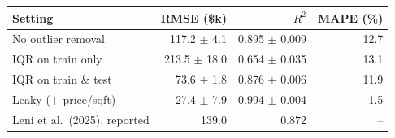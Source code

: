 \setlength{\tabcolsep}{3pt}
\begin{tabular}{lrrr}
\hline
Setting & RMSE (\$k) & $R^2$ & MAPE (\%) \\
\hline
No outlier removal & 117.2 $\pm$ 4.1 & 0.895 $\pm$ 0.009 & 12.7 \\
IQR on train only & 213.5 $\pm$ 18.0 & 0.654 $\pm$ 0.035 & 13.1 \\
IQR on train \& test & 73.6 $\pm$ 1.8 & 0.876 $\pm$ 0.006 & 11.9 \\
Leaky (+ price/sqft) & 27.4 $\pm$ 7.9 & 0.994 $\pm$ 0.004 & 1.5 \\
\hline
Leni et al.\ (2025), reported & 139.0 & 0.872 & -- \\
\hline
\end{tabular}

